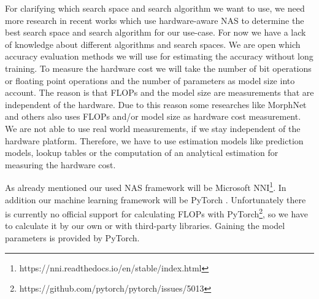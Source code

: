 \documentclass[conference]{IEEEtran}
\begin{document}
For clarifying which search space and search algorithm we want to use, we need more research in recent works which use hardware-aware NAS to determine the best search space and search algorithm for our use-case. For now we have a lack of knowledge about different algorithms and search spaces. We are open which accuracy evaluation methods we will use for estimating the accuracy without long training. To measure the hardware cost we will take the number of bit operations or floating point operations and the number of parameters as model size into account. The reason is that FLOPs and the model size are measurements that are independent of the hardware. Due to this reason some researches like MorphNet \cite{bib10} and others also uses FLOPs \cite{bib5}\cite{bib11}\cite{bib13} and/or model size \cite{bib12} as hardware cost measurement. We are not able to use real world measurements, if we stay independent of the hardware platform. Therefore, we have to use estimation models like prediction models, lookup tables or the computation of an analytical estimation for measuring the hardware cost. 

As already mentioned our used NAS framework will be Microsoft NNI\footnote{https://nni.readthedocs.io/en/stable/index.html}. In addition our machine learning framework will be PyTorch \cite{bib4}. Unfortunately there is currently no official support for calculating FLOPs with PyTorch\footnote{https://github.com/pytorch/pytorch/issues/5013}, so we have to calculate it by our own or with third-party libraries. Gaining the model parameters is provided by PyTorch.
\end{document}
